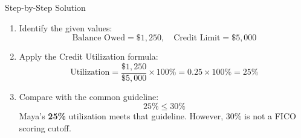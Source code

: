 \footnotesize
\begin{block}{Step-by-Step Solution}
  \begin{enumerate}
    \item Identify the given values:
      \[
        \text{Balance Owed} = \$1,250, \quad \text{Credit Limit} = \$5,000
      \]
    \item Apply the Credit Utilization formula:
      \[
        \text{Utilization} = \frac{\$1,250}{\$5,000} \times 100\% = 0.25 \times 100\% = 25\%
      \]
    \item Compare with the common guideline:
      \[
        25\% \le 30\%
      \]
      Maya's \textbf{25\%} utilization meets that guideline. However, 30\% is not a FICO scoring cutoff.
  \end{enumerate}
\end{block}
